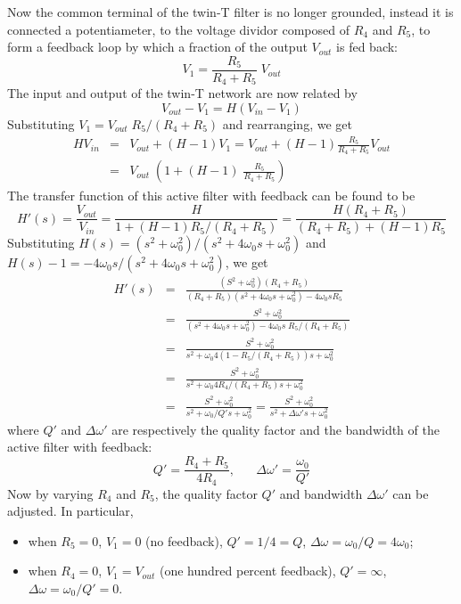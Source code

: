 Now the common terminal of the twin-T filter is no longer grounded, instead
it is connected a potentiameter, to the voltage dividor composed of $R_4$ and
$R_5$, to form a feedback loop by which a fraction of the output $V_{out}$ is 
fed back:
\[
V_1=\frac{R_5}{R_4+R_5}\;V_{out}
\]
The input and output of the twin-T network are now related by
\[
V_{out}-V_1=H(V_{in}-V_1)
\]
Substituting $V_1=V_{out}\;R_5/(R_4+R_5)$ and rearranging, we get
\begin{eqnarray}
  HV_{in}&=&V_{out}+(H-1) V_1=V_{out}+(H-1)\frac{R_5}{R_4+R_5}V_{out}
  \nonumber \\
  &=&V_{out}\;\left(1+(H-1)\;\frac{R_5}{R_4+R_5}\right)
  \nonumber
\end{eqnarray}
The transfer function of this active filter with feedback can be found to be
\[
H'(s)=\frac{V_{out}}{V_{in}}=\frac{H}{1+(H-1)R_5/(R_4+R_5)}
=\frac{H(R_4+R_5)}{(R_4+R_5)+(H-1)R_5}
\]
Substituting $H(s)=(s^2+\omega_0^2)/(s^2+4\omega_0 s+\omega_0^2)$ and
$H(s)-1=-4\omega_0s/(s^2+4\omega_0 s+\omega_0^2)$, we
get
\begin{eqnarray}
  H'(s)&=&\frac{(S^2+\omega_0^2)(R_4+R_5)}{(R_4+R_5)(s^2+4\omega_0 s+\omega_0^2)- 4\omega_0 s R_5}
  \nonumber \\
  &=&\frac{S^2+\omega_0^2}{(s^2+4\omega_0s+\omega_0^2)-4\omega_0 s\;R_5/(R_4+R_5)}
  \nonumber \\
  &=&\frac{S^2+\omega_0^2}{s^2+\omega_0 4(1-R_5/(R_4+R_5)) s+\omega_0^2}
  \nonumber \\
  &=&\frac{S^2+\omega_0^2}{s^2+\omega_0 4R_4/(R_4+R_5) s+\omega_0^2}
  \nonumber \\
  &=&\frac{S^2+\omega_0^2}{s^2+\omega_0/Q' s+\omega_0^2}
  =\frac{S^2+\omega_0^2}{s^2+\Delta\omega' s+\omega_0^2}
  \nonumber
\end{eqnarray}
where $Q'$ and $\Delta\omega'$ are respectively the quality factor and the bandwidth of the 
active filter with feedback:
\[
Q'=\frac{R_4+R_5}{4R_4},\;\;\;\;\;\;\Delta\omega'=\frac{\omega_0}{Q'}
\]
Now by varying $R_4$ and $R_5$, the quality factor $Q'$ and bandwidth $\Delta\omega'$ can 
be adjusted. In particular, 
\begin{itemize}
\item when $R_5=0$, $V_1=0$ (no feedback), $Q'=1/4=Q$, $\Delta\omega=\omega_0/Q=4\omega_0$; 
\item when $R_4=0$, $V_1=V_{out}$ (one hundred percent feedback), $Q'=\infty$, $\Delta\omega=\omega_0/Q'=0$.
\end{itemize}


